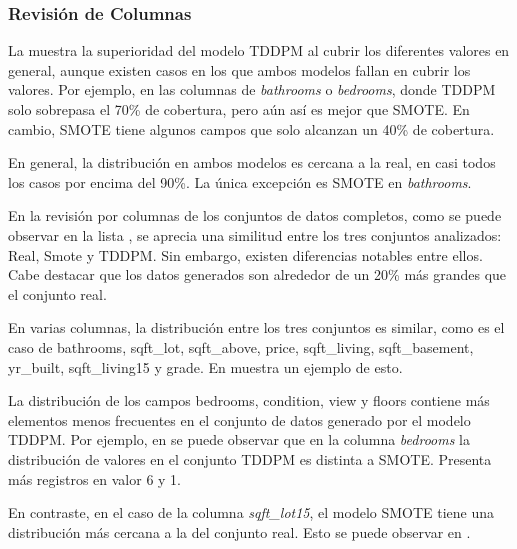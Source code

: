\newpage
\subsubsection{Revisión de Columnas}
La  muestra la superioridad del modelo TDDPM al cubrir los diferentes valores en general, aunque existen casos en los que ambos modelos fallan en cubrir los valores. Por ejemplo, en las columnas de \emph{bathrooms} o \emph{bedrooms}, donde TDDPM solo sobrepasa el 70\% de cobertura, pero aún así es mejor que SMOTE. En cambio, SMOTE tiene algunos campos que solo alcanzan un 40\% de cobertura.



\newpage
En general, la distribución en ambos modelos es cercana a la real, en casi todos los casos por encima del 90\%. La única excepción es SMOTE en \emph{bathrooms}.



\newpage

En la revisión por columnas de los conjuntos de datos completos, como se puede observar en la lista , se aprecia una similitud entre los tres conjuntos analizados: Real, Smote y TDDPM. Sin embargo, existen diferencias notables entre ellos. Cabe destacar que los datos generados son alrededor de un 20\% más grandes que el conjunto real.

En varias columnas, la distribución entre los tres conjuntos es similar, como es el caso de bathrooms, sqft\_lot, sqft\_above, price, sqft\_living, sqft\_basement, yr\_built, sqft\_living15 y grade. En  muestra un ejemplo de esto.




\newpage
La distribución de los campos bedrooms, condition, view y floors contiene más elementos menos frecuentes en el conjunto de datos generado por el modelo TDDPM. Por ejemplo, en  se puede observar que en la columna \emph{bedrooms} la distribución de valores en el conjunto TDDPM es distinta a SMOTE. Presenta más registros en valor 6 y 1.




\newpage
En contraste, en el caso de la columna \emph{sqft\_lot15}, el modelo SMOTE tiene una distribución más cercana a la del conjunto real. Esto se puede observar en .

